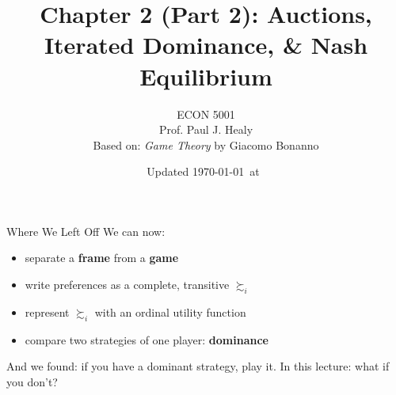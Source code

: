 

\title[Nash Equilibrium]{Chapter 2 (Part 2): Auctions, Iterated Dominance, \& Nash Equilibrium}
\author[ECON 5001]{ECON 5001\\Prof. Paul J. Healy\\Based on: \textit{Game Theory} by Giacomo Bonanno} \color{metrop}
\institute[OSU]{}
\date[]{\vfill {\tiny Updated \today\ at\ \DTMcurrenttime}}



\frame{\maketitle}

\begin{frame}{Where We Left Off}
We can now:
\begin{itemize}
    \item separate a \textbf{frame} from a \textbf{game}
    \item write preferences as a complete, transitive $\succsim_i$
    \item represent $\succsim_i$ with an ordinal utility function
    \item compare two strategies of one player: \textbf{dominance}
\end{itemize}
\bsk
And we found: if you have a dominant strategy, play it.
\vfill
In this lecture: what if you don't?
\vspace{-0.5in}
\end{frame}


